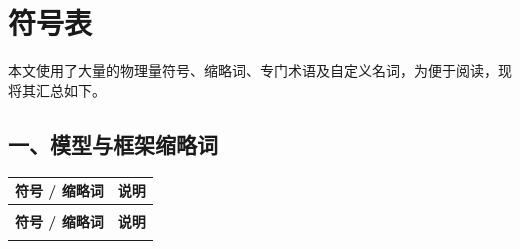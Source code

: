 \chapter*{符号表}

\noindent 本文使用了大量的物理量符号、缩略词、专门术语及自定义名词，为便于阅读，现将其汇总如下。

\section*{一、模型与框架缩略词}

\begin{longtable}{>{\raggedright\arraybackslash}p{4cm} p{10cm}}
\toprule
\textbf{符号 / 缩略词} & \textbf{说明} \\
\midrule
\endfirsthead
\multicolumn{2}{c}{\tablename\ -- 续表} \\
\toprule
\textbf{符号 / 缩略词} & \textbf{说明} \\
\midrule
\endhead
\bottomrule
\endlastfoot


\end{longtable}
